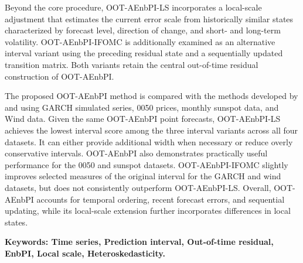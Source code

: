 Beyond the core procedure, OOT-AEnbPI-LS incorporates a local-scale adjustment that estimates the current error scale from historically similar states characterized by forecast level, direction of change, and short- and long-term volatility. OOT-AEnbPI-IFOMC is additionally examined as an alternative interval variant using the preceding residual state and a sequentially updated transition matrix. Both variants retain the central out-of-time residual construction of OOT-AEnbPI.

The proposed OOT-AEnbPI method is compared with the methods developed by
\cite{hung2026thesis} and \cite{lin2024thesis} using GARCH simulated
series, 0050 prices, monthly sunspot data, and Wind data. Given the same
OOT-AEnbPI point forecasts, OOT-AEnbPI-LS achieves the lowest interval
score among the three interval variants across all four datasets. It can
either provide additional width when necessary or reduce overly conservative
intervals. OOT-AEnbPI also demonstrates practically useful performance for the 0050
and sunspot datasets. OOT-AEnbPI-IFOMC slightly improves selected measures of
the original interval for the GARCH and wind datasets, but does not
consistently outperform OOT-AEnbPI-LS. Overall, OOT-AEnbPI accounts for temporal
ordering, recent forecast errors, and sequential updating, while its local-scale
extension further incorporates differences in local states.


\vspace{1cm}

\textbf{Keywords: Time series, Prediction interval, Out-of-time residual, EnbPI, Local scale, Heteroskedasticity.}
